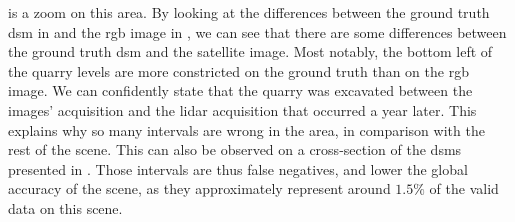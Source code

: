  is a zoom on this area. By looking at the differences between the ground truth \acrshort{dsm} in  and the \acrshort{rgb} image in , we can see that there are some differences between the ground truth \acrshort{dsm} and the satellite image. Most notably, the bottom left of the quarry levels are more constricted on the ground truth than on the \acrshort{rgb} image. We can confidently state that the quarry was excavated between the images' acquisition and the \acrshort{lidar} acquisition that occurred a year later. This explains why so many intervals are wrong in the area, in comparison with the rest of the scene. This can also be observed on a cross-section of the \acrshort{dsm}s presented in . Those intervals are thus false negatives, and lower the global accuracy of the scene, as they approximately represent around $1.5\%$ of the valid data on this scene.

